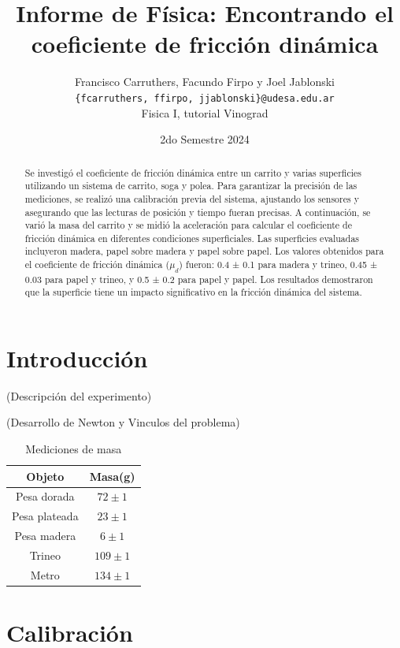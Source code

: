 \documentclass[12pt,a4]{article}
\title{Informe de Física: Encontrando el coeficiente de fricción dinámica}
\author{Francisco Carruthers, Facundo Firpo y Joel Jablonski\\ [2mm]
\small \texttt{\{fcarruthers, ffirpo, jjablonski\}@udesa.edu.ar}\\
\small Fisica I, tutorial Vinograd}
\date{2do Semestre 2024}
\begin{document}
\maketitle

\begin{abstract}
    Se investigó el coeficiente de fricción dinámica entre un carrito y varias superficies utilizando un sistema de carrito, soga y polea. Para garantizar la precisión de las mediciones, se realizó una calibración previa del sistema, ajustando los sensores y asegurando que las lecturas de posición y tiempo fueran precisas. A continuación, se varió la masa del carrito y se midió la aceleración para calcular el coeficiente de fricción dinámica en diferentes condiciones superficiales. Las superficies evaluadas incluyeron madera, papel sobre madera y papel sobre papel. Los valores obtenidos para el coeficiente de fricción dinámica ($\mu_d$) fueron: 0.4 ± 0.1 para madera y trineo, 0.45 ± 0.03 para papel y trineo, y 0.5 ± 0.2 para papel y papel. Los resultados demostraron que la superficie tiene un impacto significativo en la fricción dinámica del sistema.
\end{abstract}

\section{Introducción}

(Descripción del experimento)

(Desarrollo de Newton y Vinculos del problema)

\begin{table}
    \centering
    \begin{tabular}{|c|c|}
        \hline
        \textbf{Objeto} & \textbf{Masa(g)} \\
        \hline
        Pesa dorada & $72 \pm 1$ \\
        Pesa plateada & $23 \pm 1$ \\
        Pesa madera & $6 \pm 1$ \\
        Trineo & $109 \pm 1$ \\
        Metro & $134 \pm 1$ \\
        \hline
    \end{tabular}
    \caption{Mediciones de masa}
    \label{tab:mediciones}
\end{table}

\newpage
\section{Calibración}
\end{document}
